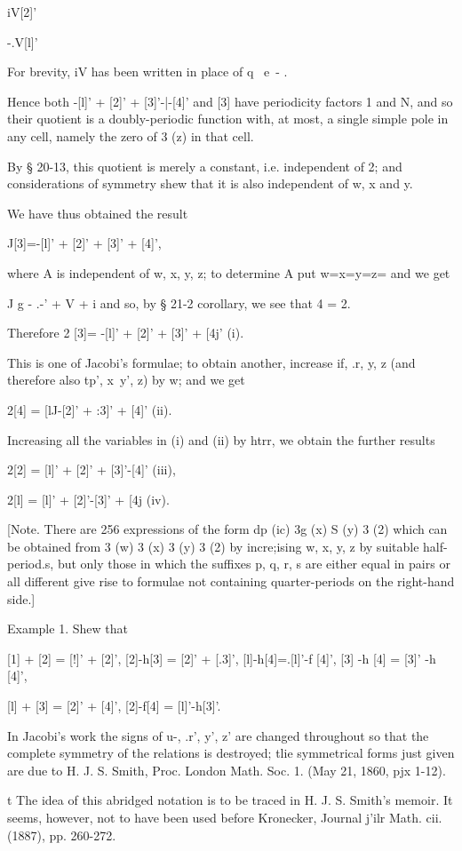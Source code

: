 iV[2]'

-.V[l]'

For brevity, iV has been written in place of q~ e~- .

Hence both -[l]' + [2]' + [3]'-|-[4]' and [3] have periodicity factors
1 and N, and so their quotient is a doubly-periodic function with, at
most, a single simple pole in any cell, namely the zero of 3 (z) in
that cell.

By § 20-13, this quotient is merely a constant, i.e. independent of 2;
and considerations of symmetry shew that it is also independent of w,
x and y.

We have thus obtained the result

J[3]=-[l]' + [2]' + [3]' + [4]',

where A is independent of w, x, y, z; to determine A put w=x=y=z= and
we get

J g - .-' + V + i and so, by § 21-2 corollary, we see that 4 = 2.

Therefore 2 [3]= -[l]' + [2]' + [3]' + [4j' (i).

This is one of Jacobi's formulae; to obtain another, increase if, .r,
y, z (and therefore also tp', x\ y', z) by w; and we get

2[4] = [lJ-[2]' + :3]' + [4]' (ii).

Increasing all the variables in (i) and (ii) by htrr, we obtain the
further results

2[2] = [l]' + [2]' + [3]'-[4]' (iii),

2[l] = [l]' + [2]'-[3]' + [4j (iv).

[Note. There are 256 expressions of the form dp (ic) 3g (x) S (y) 3
(2) which can be obtained from 3 (w) 3 (x) 3 (y) 3 (2) by incre;ising
w, x, y, z by suitable half-period.s, but only those in which the
suffixes p, q, r, s are either equal in pairs or all different give
rise to formulae not containing quarter-periods on the right-hand
side.]

Example 1. Shew that

[1] + [2] = [!]' + [2]', [2]-h[3] = [2]' + [.3]', [l]-h[4]=.[l]'-f
[4]', [3] -h [4] = [3]' -h [4]',

[l] + [3] = [2]' + [4]', [2]-f[4] = [l]'-h[3]'.

In Jacobi's work the signs of u-, .r', y', z' are changed throughout
so that the complete symmetry of the relations is destroyed; tlie
symmetrical forms just given are due to H. J. S. Smith, Proc. London
Math. Soc. 1. (May 21, 1860, pjx 1-12).

t The idea of this abridged notation is to be traced in H. J. S.
Smith's memoir. It seems, however, not to have been used before
Kronecker, Journal j'ilr Math. cii. (1887), pp. 260-272.

